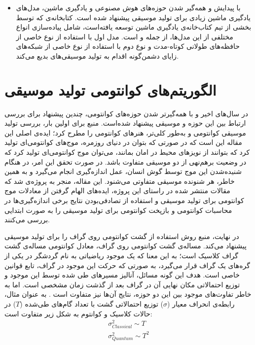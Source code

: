 \begin{itemize}
\item 
با پیدایش و همه‌گیر شدن حوزه‌های هوش مصنوعی و یادگیری ماشین، مدل‌های یادگیری ماشین زیادی برای تولید موسیقی پیشنهاد شده است.
کتابخانه‌ی 
که توسط بخشی از تیم کتاب‌خانه‌ی یادگیری ماشین
توسعه یافته‌است، شامل پیاده‌سازی انواع مختلفی از این مدل‌ها، از جمله
\cite{magenta_melodyrnn}
و
\cite{magenta_gansynth}
است. مدل اول با استفاده از نوع خاصی از حافظه‌های طولانی کوتاه-مدت
و نوع دوم با استفاده از نوع خاصی از شبکه‌های زایای دشمن‌گونه اقدام به تولید موسیقی‌های بدیع می‌کند.
\end{itemize}

\section{الگوریتم‌های کوانتومی تولید موسیقی}

در سال‌های اخیر و با همه‌گیرتر شدن حوزه‌های کوانتومی، چندین پیشنهاد برای بررسی ارتباط بین این حوزه و موسیقی پیشنهاد شده‌است. منبع
\cite{Putz_quantum_music}
برای اولین بار، بررسی تولید موسیقی کوانتومی و به‌طور کلی‌تر، هنرهای کوانتومی را مطرح کرد؛ ایده‌ی اصلی این مقاله این است که در صورتی که بتوان در دنیای روزمره، موج‌های کوانتومی‌ای تولید کرد که بتوانند از نویزهای محیط در امان بمانند، می‌توان موج کوانتومی‌ای تولید کرد که در وضعیت برهم‌نهی از دو موسیقی متفاوت باشد. در صورت تحقق این امر، در هنگام شنیده‌شدن این موج توسط گوش انسان، عمل اندازه‌گیری انجام می‌گیرد و به همین خاطر، هر شنونده موسیقی متفاوتی می‌شنود.
این مقاله، منجر به پروژه‌ی
\cite{quantum_music_event}
شد که مقالات منتشر شده در راستای این پروژه، ایده‌های الهام گرفتن از معادلات موج کوانتومی برای تولید موسیقی
\cite{Helweg_QInspired_Music}
و استفاده از تصادفی‌بودن نتایج برخی اندازه‌گیری‌ها در محاسبات کوانتومی و بازپخت کوانتومی برای تولید موسیقی
\cite{Kirke_QC_Music}
را به صورت ابتدایی بررسی می‌کنند.

در نهایت، منبع
\cite{miranda}
روش استفاده از گشت کوانتومی روی گراف را
برای تولید موسیقی پیشنهاد می‌کند.
مساله‌ی گشت کوانتومی روی گراف، معادل کوانتومی مساله‌ی گشت گراف کلاسیک است؛ به این معنا که یک موجود ریاضیاتی به نام گردشگر در یکی از گره‌های یک گراف قرار می‌گیرد، به صورتی که حرکت این موجود در گراف، تابع قوانین خاصی است. هدف این گونه مسائل، آنالیز مسیرهای طی شده توسط این موجود و توزیع احتمالاتی مکان نهایی آن در گراف بعد از گذشت زمان مشخصی است.
اما به خاطر تفاوت‌های موجود بین این دو حوزه، نتایج آن‌ها نیز متفاوت است
\cite{Kempe_qwalk}.
به عنوان مثال، رابطه‌ی انحراف معیار ($\sigma$)
توزیع احتمالاتی گشت با تعداد گام‌های طی‌شده
($T$)
در حالات کلاسیک و کوانتوم به شکل زیر متفاوت است:
\begin{equation}
\begin{gathered}
    \sigma^2_{Classical} \sim T \\[3pt]
    \sigma^2_{Quantum} \sim T^2
\end{gathered}
\end{equation}

